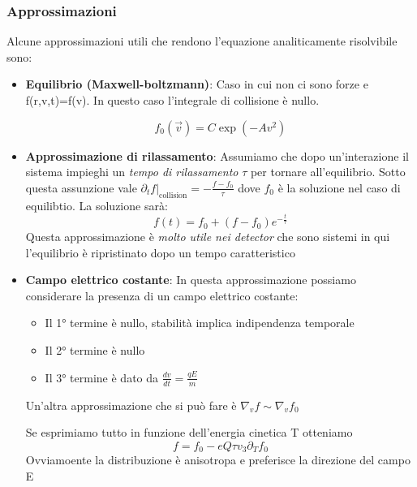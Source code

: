 \subsubsection*{Approssimazioni}
Alcune approssimazioni utili che rendono l'equazione analiticamente risolvibile sono:
\begin{itemize}
    \item \textbf{Equilibrio (Maxwell-boltzmann)}: Caso in cui non ci sono forze e f(r,v,t)=f(v). In questo caso l'integrale di collisione è nullo.

$$
f_0(\vec{v})=C \exp(-Av^2)
$$

\item \textbf{Approssimazione di rilassamento}: Assumiamo che dopo un'interazione il sistema impieghi un \textit{tempo di rilassamento} $\tau$ per tornare all'equilibrio. 
  Sotto questa assunzione vale $\partial_tf|_\text{collision}=-\frac{f-f_0}{\tau}$ dove $f_0$ è la soluzione nel caso di equilibtio. 
  La soluzione sarà:
  $$
  f(t)=f_0+(f-f_0)e^{-\frac{t}{\tau}}
  $$
  Questa approssimazione è \textit{molto utile nei detector} che sono sistemi in qui l'equilibrio è ripristinato dopo un tempo caratteristico

  \item \textbf{Campo elettrico costante}: In questa approssimazione possiamo considerare la presenza di un campo elettrico costante: 
    \begin{itemize}
        \item Il 1° termine è nullo, stabilità implica indipendenza temporale

    \item Il 2° termine è nullo
    \item Il 3° termine è dato da $\frac{dv}{dt}=\frac{qE}{m}$
    \end{itemize}
    

    Un'altra approssimazione che si può fare è $\nabla_v f \sim \nabla_vf_0$

    Se esprimiamo tutto in funzione dell'energia cinetica T otteniamo
    $$
    f= f_0-eQ\tau v_3\partial_Tf_0
    $$
    Ovviamoente la distribuzione è anisotropa e preferisce la direzione del campo E

\end{itemize}

